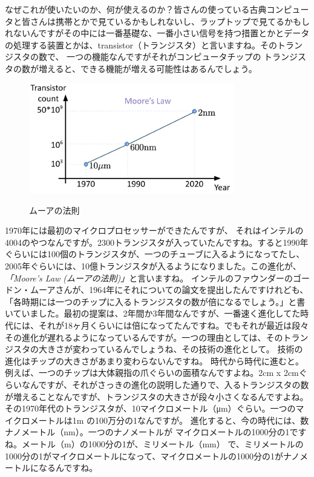 なぜこれが使いたいのか、何が使えるのか？皆さんの使っている古典コンピュータと皆さんは携帯とかで見ているかもしれないし、ラップトップで見てるかもしれないんですがその中には一番基礎な、一番小さい信号を持つ措置とかとデータの処理する装置とかは、transistor（トランジスタ）と言いますね。そのトランジスタの数で、 一つの機能なんですがそれがコンピュータチップの
トランジスタの数が増えると、できる機能が増える可能性はあるんでしょう。
\begin{figure}[H]
    \centering
    \includegraphics[width=0.8\textwidth]{lesson1/moore_law.pdf}
    \label{fig: 1}
    \begin{center}
        \caption{ムーアの法則}
    \end{center}
\end{figure}
1970年には最初のマイクロプロセッサーができたんですが、
それはインテルの4004のやつなんですが。2300トランジスタが入っていたんですね。すると1990年ぐらいには100個のトランジスタが、一つのチューブに入るようになってたし、2005年ぐらいには、10億トランジスタが入るようになりました。この進化が、\emph{「Moore's Law (ムーアの法則)」}と言いますね。
インテルのファウンダーのゴードン・ムーアさんが、1964年にそれについての論文を提出したんですけれども、「各時期には一つのチップに入るトランジスタの数が倍になるでしょう。」と書いていました。最初の提案は、2年間か3年間なんですが、一番速く進化してた時代には、それが18ヶ月くらいには倍になってたんですね。でもそれが最近は段々その進化が遅れるようになっているんですが。一つの理由としては、そのトランジスタの大きさが変わっているんでしょうね、その技術の進化として。
技術の進化はチップの大きさがあまり変わらないんですね。
時代から時代に進むと。例えば、一つのチップは大体親指の爪ぐらいの面積なんですよね。2cm x 2cmぐらいなんですが、それがさっきの進化の説明した通りで、入るトランジスタの数が増えることなんですが、トランジスタの大きさが段々小さくなるんですよね。その1970年代のトランジスタが、10マイクロメートル（μm）ぐらい。一つのマイクロメートルは1m の100万分の1なんですが。
進化すると、今の時代には、数ナノメートル（nm）。一つのナノメートルが
マイクロメートルの1000分の1ですね。メートル（m）の1000分の1が、ミリメートル（mm） で、ミリメートルの1000分の1がマイクロメートルになって、マイクロメートルの1000分の1がナノメートルになるんですね。

